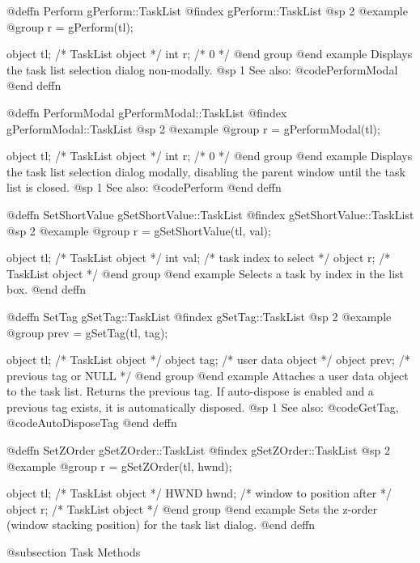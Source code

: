 @deffn {Perform} gPerform::TaskList
@findex gPerform::TaskList
@sp 2
@example
@group
r = gPerform(tl);

object  tl;   /*  TaskList object  */
int     r;    /*  0                */
@end group
@end example
Displays the task list selection dialog non-modally.
@sp 1
See also:  @code{PerformModal}
@end deffn



@deffn {PerformModal} gPerformModal::TaskList
@findex gPerformModal::TaskList
@sp 2
@example
@group
r = gPerformModal(tl);

object  tl;   /*  TaskList object  */
int     r;    /*  0                */
@end group
@end example
Displays the task list selection dialog modally, disabling the parent
window until the task list is closed.
@sp 1
See also:  @code{Perform}
@end deffn



@deffn {SetShortValue} gSetShortValue::TaskList
@findex gSetShortValue::TaskList
@sp 2
@example
@group
r = gSetShortValue(tl, val);

object  tl;    /*  TaskList object          */
int     val;   /*  task index to select     */
object  r;     /*  TaskList object          */
@end group
@end example
Selects a task by index in the list box.
@end deffn



@deffn {SetTag} gSetTag::TaskList
@findex gSetTag::TaskList
@sp 2
@example
@group
prev = gSetTag(tl, tag);

object  tl;     /*  TaskList object          */
object  tag;    /*  user data object         */
object  prev;   /*  previous tag or NULL     */
@end group
@end example
Attaches a user data object to the task list.  Returns the previous tag.
If auto-dispose is enabled and a previous tag exists, it is automatically
disposed.
@sp 1
See also:  @code{GetTag}, @code{AutoDisposeTag}
@end deffn



@deffn {SetZOrder} gSetZOrder::TaskList
@findex gSetZOrder::TaskList
@sp 2
@example
@group
r = gSetZOrder(tl, hwnd);

object  tl;     /*  TaskList object           */
HWND    hwnd;   /*  window to position after  */
object  r;      /*  TaskList object           */
@end group
@end example
Sets the z-order (window stacking position) for the task list dialog.
@end deffn



@subsection Task Methods




